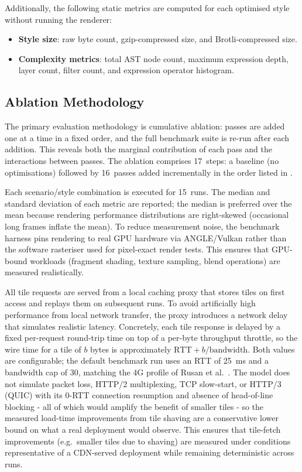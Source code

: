 \noindent Additionally, the following static metrics are computed for each optimised style without running the renderer:

\begin{itemize}
    \item \textbf{Style size}: raw byte count, gzip-compressed size, and Brotli-compressed size.
    \item \textbf{Complexity metrics}: total \ac{AST} node count, maximum expression depth, layer count, filter count, and expression operator histogram.
\end{itemize}

\subsection{Ablation Methodology}\label{sub_ablation}

The primary evaluation methodology is cumulative ablation: passes are added one at a time in a fixed order, and the full benchmark suite is re-run after each addition.
This reveals both the marginal contribution of each pass and the interactions between passes.
The ablation comprises 17~steps: a baseline (no optimisations) followed by 16~passes added incrementally in the order listed in .

Each scenario/style combination is executed for 15~runs.
The median and standard deviation of each metric are reported; the median is preferred over the mean because rendering performance distributions are right-skewed (occasional long frames inflate the mean).
To reduce measurement noise, the benchmark harness pins rendering to real GPU hardware via ANGLE/Vulkan rather than the software rasteriser used for pixel-exact render tests.
This ensures that GPU-bound workloads (fragment shading, texture sampling, blend operations) are measured realistically.

All tile requests are served from a local caching proxy that stores tiles on first access and replays them on subsequent runs.
To avoid artificially high performance from local network transfer, the proxy introduces a network delay that simulates realistic latency.
Concretely, each tile response is delayed by a fixed per-request round-trip time on top of a per-byte throughput throttle, so the wire time for a tile of $b$ bytes is approximately $\mathrm{RTT} + b / \mathrm{bandwidth}$.
Both values are configurable; the default benchmark run uses an \ac{RTT} of \qty{25}{\milli\second} and a bandwidth cap of \qty{30}{\Mbps}, matching the 4G profile of Rusan et al.~\cite{rusanAssessmentPacketLatency2015}.
The model does not simulate packet loss, HTTP/2 multiplexing, TCP slow-start, or HTTP/3 (QUIC) with its 0-RTT connection resumption and absence of head-of-line blocking - all of which would amplify the benefit of smaller tiles - so the measured load-time improvements from tile shaving are a conservative lower bound on what a real deployment would observe.
This ensures that tile-fetch improvements (e.g.\ smaller tiles due to shaving) are measured under conditions representative of a \ac{CDN}-served deployment while remaining deterministic across runs.


